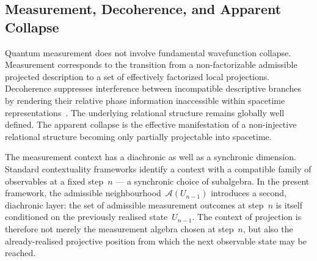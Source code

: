 \subsection{Measurement, Decoherence, and Apparent Collapse}
  \label{subsec:measurement-and-decoherence}

  Quantum measurement does not involve fundamental wavefunction collapse.
  Measurement corresponds to the transition from a non-factorizable
  admissible projected description to a set of effectively factorized local projections.
  Decoherence suppresses interference between incompatible descriptive
  branches by rendering their relative phase information inaccessible
  within spacetime representations~\cite{Zurek2003}.
  The underlying relational structure remains globally well defined.
  The apparent collapse is the effective manifestation of a non-injective
  relational structure becoming only partially projectable into spacetime.

  The measurement context has a diachronic as well as a synchronic dimension.
  Standard contextuality frameworks identify a context with a compatible family
  of observables at a fixed step~$n$ --- a synchronic choice of subalgebra.
  In the present framework, the admissible neighbourhood~$\mathcal{A}(U_{n-1})$
  introduces a second, diachronic layer: the set of admissible measurement
  outcomes at step~$n$ is itself conditioned on the previously realised
  state~$U_{n-1}$.
  The context of projection is therefore not merely the measurement algebra
  chosen at step~$n$, but also the already-realised projective position from
  which the next observable state may be reached.
